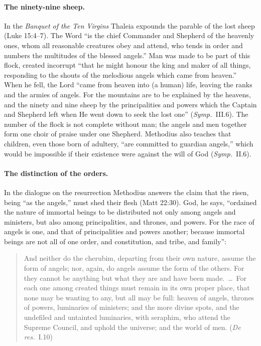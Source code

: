 \paragraph{The ninety-nine sheep.} In the \emph{Banquet of the Ten Virgins}
Thaleia expounds the parable of the lost sheep (Luke 15:4--7). The Word ``is
the chief Commander and Shepherd of the heavenly ones, whom all reasonable
creatures obey and attend, who tends in order and numbers the multitudes of
the blessed angels.'' Man was made to be part of this flock, created
incorrupt ``that he might honour the king and maker of all things,
responding to the shouts of the melodious angels which came from heaven.''
When he fell, the Lord ``came from heaven into (a human) life, leaving the
ranks and the armies of angels. For the mountains are to be explained by
the heavens, and the ninety and nine sheep by the principalities and powers
which the Captain and Shepherd left when He went down to seek the lost
one'' (\emph{Symp.}\ III.6). The number of the flock is not complete
without man; the angels and men together form one choir of praise under one
Shepherd. Methodius also teaches that children, even those born of
adultery, ``are committed to guardian angels,'' which would be impossible if
their existence were against the will of God (\emph{Symp.}\ II.6).

\paragraph{The distinction of the orders.} In the dialogue on the
resurrection Methodius answers the claim that the risen, being ``as the
angels,'' must shed their flesh (Matt 22:30). God, he says, ``ordained the
nature of immortal beings to be distributed not only among angels and
ministers, but also among principalities, and thrones, and powers. For the
race of angels is one, and that of principalities and powers another;
because immortal beings are not all of one order, and constitution, and
tribe, and family'':

\begin{quote}
And neither do the cherubim, departing from their own nature, assume the
form of angels; nor, again, do angels assume the form of the others. For
they cannot be anything but what they are and have been made.~\dots\ For
each one among created things must remain in its own proper place, that
none may be wanting to any, but all may be full: heaven of angels, thrones
of powers, luminaries of ministers; and the more divine spots, and the
undefiled and untainted luminaries, with seraphim, who attend the Supreme
Council, and uphold the universe; and the world of men. (\emph{De res.}\
I.10)
\end{quote}

